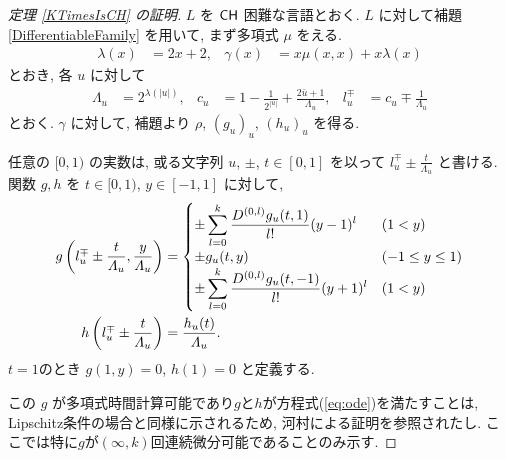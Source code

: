 \begin{proof}[\rm 定理 \ref{KTimesIsCH} の証明]
 $L$ を $\mathsf{CH}$ 困難な言語とおく.
 $L$ に対して補題 \ref{DifferentiableFamily} を用いて,
 まず多項式 $\mu$ をえる.
 \begin{align}
  \lambda(x) &= 2x + 2,&
  \gamma(x) &= x \mu(x, x) + x \lambda(x)
 \end{align}
 とおき, 各 $u$ に対して 
\begin{align}
 \Lambda_u 
 &= 2^{\lambda(|u|)}, &
 c_u 
 &= 1-\frac{1}{2^{|u|}}+\frac{2\bar{u}+1}{\Lambda_u}, &
 l_u^\mp 
 &= c_u\mp\frac{1}{\Lambda_u} 
\end{align}  
 とおく. 
 $\gamma$ に対して, 補題より $\rho$, $(g_u)_u$, $(h_u)_u$ を得る.


 任意の $[0,1)$ の実数は, 或る文字列 $u$, $\pm$, $t\in [0,1]$ を以って
 $l^\mp_u \pm \frac{t}{\Lambda_u}$ と書ける.
 関数 $g, h$ を $t \in [0,1)$, $y \in [-1, 1]$ に対して,
 \begin{align}
 g \left(l^\mp_u \pm \frac{t}{\varLambda_u}, \frac{y}{\varLambda_u}\right)
  &= \begin{cases}
      \pm \displaystyle \sum_{l=0}^k \frac{D^{(0,l)}g_u(t,1)}{l!} (y-1)^l 
      &  (1<y) \\
      \pm g_u(t, y)      & (-1 \le y \le 1) \\
      \pm \displaystyle \sum_{l=0}^k \frac{D^{(0,l)}g_u(t,-1)}{l!} (y+1)^l  
      &  (1<y) \\
    \end{cases} 
  \\
 h \left( l^\mp_u \pm \frac{t}{\varLambda_u} \right) 
  & = \frac{h_u(t)}{\varLambda_u}.
\end{align}
 $t=1$のとき $g(1,y) = 0$, $h(1) = 0$ と定義する.

 この $g$ が多項式時間計算可能であり$g$と$h$が方程式(\ref{eq:ode})を満たすことは,
 Lipschitz条件の場合と同様に示されるため,
 河村による証明を参照されたし\cite[定理3.2]{kawamura2010lipschitz}.
 ここでは特に$g$が$(\infty, k)$回連続微分可能であることのみ示す.


\end{proof}

